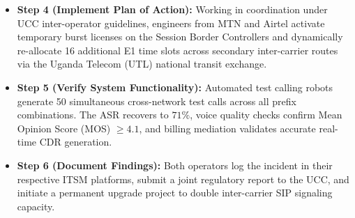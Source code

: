 \documentclass[12pt,a4paper]{report}
\begin{document}
\begin{itemize}
    \item \textbf{Step 4 (Implement Plan of Action):} Working in coordination under UCC inter-operator guidelines, engineers from MTN and Airtel activate temporary burst licenses on the Session Border Controllers and dynamically re-allocate 16 additional E1 time slots across secondary inter-carrier routes via the Uganda Telecom (UTL) national transit exchange.
    
    \item \textbf{Step 5 (Verify System Functionality):} Automated test calling robots generate 50 simultaneous cross-network test calls across all prefix combinations. The ASR recovers to $71\%$, voice quality checks confirm Mean Opinion Score (MOS) $\ge 4.1$, and billing mediation validates accurate real-time CDR generation.
    
    \item \textbf{Step 6 (Document Findings):} Both operators log the incident in their respective ITSM platforms, submit a joint regulatory report to the UCC, and initiate a permanent upgrade project to double inter-carrier SIP signaling capacity.
\end{itemize}
\end{document}
